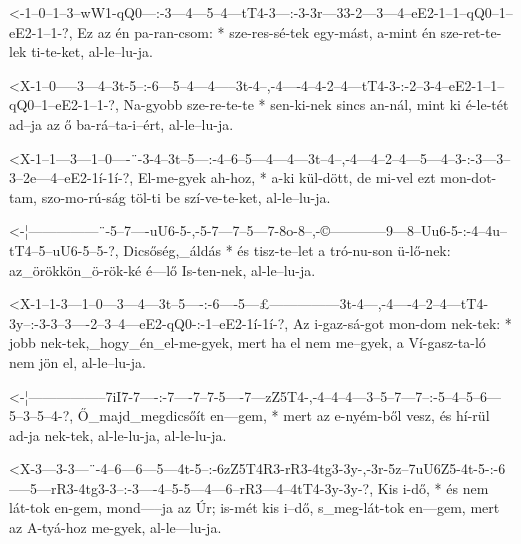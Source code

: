   {<-1--0--1--3--wW1-qQ0---:-3---4---5--4---tT4-3---:-3-3r---33-2---3---4--eE2-1--1--qQ0--1--eE2-1--1-?,}
  {  Ez az én pa-ran-csom: * sze-res-sé-tek egy-mást, a-mint én sze-ret-te-lek ti-te-ket, al-le--lu-ja.}

  {<X-1--0-----3---4--3t-5--:-6---5--4---4-----3t-4--,-4----4--4-2--4---tT4-3-:-2--3-4--eE2-1--1--qQ0--1--eE2-1--1-?,}
  {   Na-gyobb sze-re-te-te * sen-ki-nek sincs an-nál, mint ki é-le-tét ad--ja  az ő ba-rá--ta-i--ért, al-le--lu-ja.}




  {<X-1--1---3---1--0----¨-3-4--3t--5---:-4--6--5---4---4---3t--4--,-4---4--2--4---5---4--3-:-3---3--3--2e---4--eE2-1í-1í-?,}
  {   El-me-gyek ah-hoz, * a-ki kül-dött, de mi-vel ezt mon-dot-tam, szo-mo-rú-ság töl-ti be  szí-ve-te-ket, al-le--lu-ja.}


  {<-¦---------------¨-5--7----uU6-5-,-5-7---7--5---7-8o-8--,-©------------9---8--Uu6-5-:-4--4u--tT4--5--uU6-5--5-?,}
  {  Dicsőség,_áldás * és tisz-te--let a tró-nu-son ü-lő-nek: az_örökkön_ö-rök-ké é---lő  Is-ten-nek, al-le--lu-ja.}


  {<X-1--1-3---1--0---3---4---3t--5----:-6----5---£---------------3t-4---,-4----4--2--4---tT4-3y--:-3-3--3----2--3--4---eE2-qQ0-:-1--eE2-1í-1í-?,}
  {   Az i-gaz-sá-got mon-dom nek-tek: * jobb nek-tek,_hogy_én_el-me-gyek, mert ha el nem me--gyek, a Ví-gasz-ta-ló nem jön el,   al-le--lu-ja.}


  {<-¦-----------------7iI7-7----:-7----7--7-5----7---zZ5T4-,-4--4--4---3--5--7---7--:-5--4--5--6---5--3--5--4-?,}
  {  Ő_majd_megdicsőít en---gem, * mert az e-nyém-ből vesz,   és hí-rül ad-ja nek-tek, al-le-lu-ja, al-le-lu-ja.}


  {<X-3---3-3---¨-4--6---6---5---4t-5--:-6zZ5T4R3-rR3-4tg3-3y-,-3r-5z--7uU6Z5-4t-5-:-6-----5---rR3-4tg3-3--:-3----4--5-5---4---6--rR3---4--4tT4-3y-3y-?,}
  {   Kis i-dő, * és nem lát-tok en-gem, mond-----ja  az   Úr;  is-mét kis    i--dő, s_meg-lát-tok en---gem, mert az A-tyá-hoz me-gyek, al-le---lu-ja.}

